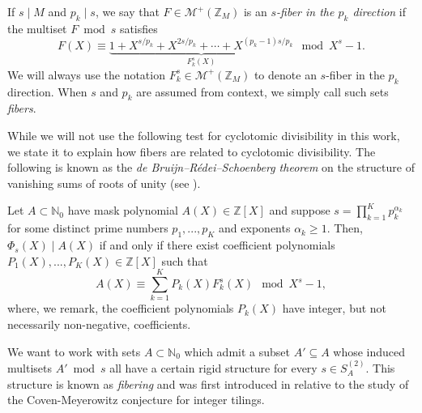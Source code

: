 \documentclass[12pt]{amsart}
\numberwithin{equation}{section}
\begin{document}
If $s \mid M$ and $p_k \mid s$, we say that $F \in \mathcal{M}^+ (\mathbb{Z}_M)$ is an \textit{$s$-fiber in the $p_k$ direction} if the multiset $F \bmod s$ satisfies
$$
F (X) \equiv \underbrace{1 + X^{s/p_k} + X^{2s/p_k} + \cdots + X^{(p_k - 1)s/p_k}}_{F_k^s (X)} \mod X^s - 1.
$$
We will always use the notation $F_k^s \in \mathcal{M}^+ (\mathbb{Z}_M)$ to denote an $s$-fiber in the $p_k$ direction. When $s$ and $p_k$ are assumed from context, we simply call such sets \textit{fibers}.

While we will not use the following test for cyclotomic divisibility in this work, we state it to explain how fibers are related to cyclotomic divisibility. The following is known as the \textit{de Bruijn--R\'edei--Schoenberg theorem} on the structure of vanishing sums of roots of unity (see \cite{deB,LL,Mann,Re1,Re2,schoen}).

\begin{theorem}\label{thm:BRSvanishing}
Let $A \subset \mathbb{N}_{0}$ have mask polynomial $A(X) \in \mathbb{Z}[X]$ and suppose $s = \prod_{k=1}^K p_k^{\alpha_k}$ for some distinct prime numbers $p_1,...,p_K$ and exponents $\alpha_k \geq 1$. Then, $\Phi_s (X) \mid A(X)$ if and only if there exist coefficient polynomials $P_1(X),...,P_K (X) \in \mathbb{Z}[X]$ such that
\begin{equation}\label{eq:bruijnredeischoen}
    A(X) \equiv \sum\limits_{k=1}^{K} P_k (X) F_k^s (X) \mod X^s - 1,
\end{equation}
where, we remark, the coefficient polynomials $P_k (X)$ have integer, but not necessarily non-negative, coefficients.
\end{theorem}

We want to work with sets $A \subset \mathbb{N}_0$ which admit a subset $A' \subseteq A$ whose induced multisets $A' \bmod s$ all have a certain rigid structure for every $s \in S_A^{(2)}$. This structure is known as \textit{fibering} and was first introduced in \cite[Section 3]{KLMS} relative to the study of the Coven-Meyerowitz conjecture for integer tilings.
\end{document}

